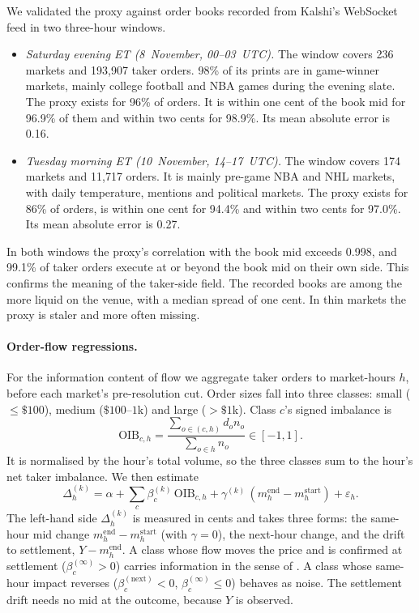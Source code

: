 We validated the proxy against order books recorded from Kalshi's WebSocket feed in two
three-hour windows.
\begin{itemize}
  \item \emph{Saturday evening ET (8~November, 00--03~UTC).} The window covers 236 markets and
  193,907 taker orders. 98\% of its prints are in game-winner markets, mainly college football
  and NBA games during the evening slate. The proxy exists for 96\% of orders. It is within one
  cent of the book mid for 96.9\% of them and within two cents for 98.9\%. Its mean absolute
  error is 0.16\cents.
  \item \emph{Tuesday morning ET (10~November, 14--17~UTC).} The window covers 174 markets and
  11,717 orders. It is mainly pre-game NBA and NHL markets, with daily temperature, mentions and
  political markets. The proxy exists for 86\% of orders, is within one cent for 94.4\% and
  within two cents for 97.0\%. Its mean absolute error is 0.27\cents.
\end{itemize}
In both windows the proxy's correlation with the book mid exceeds 0.998, and 99.1\% of taker
orders execute at or beyond the book mid on their own side. This confirms the meaning of the
taker-side field. The recorded books are among the more liquid on the venue, with a median
spread of one cent. In thin markets the proxy is staler and more often missing.

\paragraph{Order-flow regressions.} For the information content of flow we aggregate taker
orders to market-hours $h$, before each market's pre-resolution cut. Order sizes fall into three
classes: small ($\le\$100$), medium ($\$100$--$1$k) and large ($>\$1$k). Class $c$'s signed
imbalance is
\begin{equation}\label{eq:flow-oib}
  \mathrm{OIB}_{c,h}=\frac{\sum_{o\in(c,h)} d_o n_o}{\sum_{o\in h} n_o}\in[-1,1].
\end{equation}
It is normalised by the hour's total volume, so the three classes sum to the hour's net taker
imbalance. We then estimate
\begin{equation}\label{eq:flow-reg}
  \Delta^{(k)}_{h}=\alpha+\sum_{c}\beta^{(k)}_c\,\mathrm{OIB}_{c,h}
  +\gamma^{(k)}\,(m^{\mathrm{end}}_h-m^{\mathrm{start}}_h)+\varepsilon_h .
\end{equation}
The left-hand side $\Delta^{(k)}_h$ is measured in cents and takes three forms: the same-hour mid
change $m^{\mathrm{end}}_h-m^{\mathrm{start}}_h$ (with $\gamma=0$), the next-hour change, and the
drift to settlement, $Y-m^{\mathrm{end}}_h$. A class whose flow moves the price and is
confirmed at settlement ($\beta^{(\infty)}_c>0$) carries information in the sense of
\citet{kyle1985}. A class whose same-hour impact reverses ($\beta^{(\mathrm{next})}_c<0$,
$\beta^{(\infty)}_c\le0$) behaves as noise. The settlement drift needs no mid at the outcome,
because $Y$ is observed.

